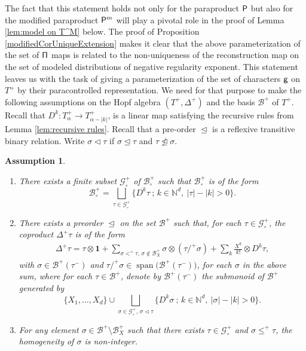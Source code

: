 \documentclass[10pt]{amsart}
\DeclareMathOperator{\Span}{span}
\theoremstyle{plain}
\newtheorem{assumption}{Assumption}
\theoremstyle{definition}
\newcommand{\unit}{\mathbf{1}}
\let\pord\trianglelefteq
\let\spord\triangleleft
\newcommand{\mcB}{\mathcal{B}}
\newcommand{\mcG}{\mathcal{G}}
\begin{document}
The fact that this statement holds not only for the paraproduct $\sf P$ but also for the modified paraproduct ${\sf P}^m$ will play a pivotal role in the proof of Lemma \ref{lem:model on T^M} below. The proof of Proposition \ref{modifiedCorUniqueExtension} makes it clear that the above parameterization of the set of $\sf \Pi$ maps is related to the non-uniqueness of the reconstruction map on the set of modeled distributions of negative regularity exponent. This statement leaves us with the task of giving a parameterization of the set of characters $\sf g$ on $T^+$ by their paracontrolled representation. We need for that purpose to make the following assumptions on the Hopf algebra $(T^+,\Delta^+)$ and the basis $\mcB^+$ of $T^+$. Recall that $D^k:T_\alpha^+\to T_{\alpha-|k|}^+$, is a linear map satisfying the recursive rules from Lemma \ref{lem:recursive rules}. Recall that a pre-order $\pord$ is a reflexive transitive binary relation. Write $\sigma\spord\tau$ if $\sigma\pord\tau$ and $\tau\ntrianglelefteq\sigma$.

\skpt
\begin{assumption}\label{ass:C}
\begin{enumerate}
\item\label{ass:C1}
There exists a finite subset $\mcG_\circ^+$ of $\mcB_\circ^+$ such that $\mcB_\circ^+$ is of the form
\[
\mcB_\circ^+ = \bigsqcup_{\tau\in\mcG_\circ^+} \bigl\{D^k\tau\ ;\, k\in\mathbb{N}^d,\ |\tau|-|k|>0\bigr\}.
\]
	\item\label{ass:C2}
	There exists a preorder $\pord$ on the set $\mcB^+$ such that, for each $\tau\in\mcG_\circ^+$,
	the coproduct $\Delta^+\tau$ is of the form
\begin{align}\label{eq:canonical coproduct}
\Delta^+\tau=\tau\otimes\unit+\sum_{\sigma<^+\tau,\, \sigma\notin\mcB_X^+}\sigma\otimes(\tau/^+\sigma) + \sum_{k}\frac{X^{k}}{k!}\otimes D^k\tau,
\end{align}
with $\sigma\in\mcB^+(\tau^-)$ and $\tau/^+\sigma\in\Span\bigl(\mcB^+(\tau^-)\bigr)$, for each $\sigma$ in the above sum,
where for each $\tau\in\mcB^+$, denote by $\mcB^+(\tau^-)$ the submonoid of $\mcB^+$ generated by
\[
\big\{X_1,\dots,X_d\big\}\cup\bigsqcup_{\sigma\in\mcG_\circ^+,\, \sigma\spord\tau} \bigl\{D^k\sigma\ ;\, k\in\mathbb{N}^d,\ |\sigma|-|k|>0\bigr\}.
\]

\item\label{ass:C3}
For any element $\sigma\in\mcB^+\setminus\mcB_X^+$ such that there exists $\tau\in\mcG_\circ^+$ and $\sigma\le^+\tau$, the homogeneity of $\sigma$ is non-integer.
\end{enumerate}
\end{assumption}
\end{document}

